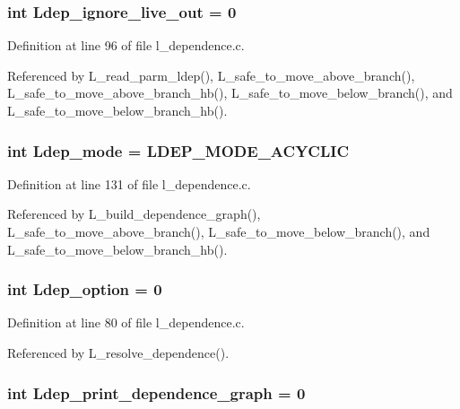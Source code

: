 \subsubsection{\setlength{\rightskip}{0pt plus 5cm}int \bf{Ldep\_\-ignore\_\-live\_\-out} = 0}\label{l__dependence_8c_6d934474a953e6ae08ebb56bf3e665fb}




Definition at line 96 of file l\_\-dependence.c.

Referenced by L\_\-read\_\-parm\_\-ldep(), L\_\-safe\_\-to\_\-move\_\-above\_\-branch(), L\_\-safe\_\-to\_\-move\_\-above\_\-branch\_\-hb(), L\_\-safe\_\-to\_\-move\_\-below\_\-branch(), and L\_\-safe\_\-to\_\-move\_\-below\_\-branch\_\-hb().
\subsubsection{\setlength{\rightskip}{0pt plus 5cm}int \bf{Ldep\_\-mode} = LDEP\_\-MODE\_\-ACYCLIC\hspace{0.3cm}{\tt  [static]}}\label{l__dependence_8c_681b9a75fbb67d7e5cd569408eb3f3da}




Definition at line 131 of file l\_\-dependence.c.

Referenced by L\_\-build\_\-dependence\_\-graph(), L\_\-safe\_\-to\_\-move\_\-above\_\-branch(), L\_\-safe\_\-to\_\-move\_\-below\_\-branch(), and L\_\-safe\_\-to\_\-move\_\-below\_\-branch\_\-hb().
\subsubsection{\setlength{\rightskip}{0pt plus 5cm}int \bf{Ldep\_\-option} = 0}\label{l__dependence_8c_1486b324e7da3513f46008bf5df24297}




Definition at line 80 of file l\_\-dependence.c.

Referenced by L\_\-resolve\_\-dependence().
\subsubsection{\setlength{\rightskip}{0pt plus 5cm}int \bf{Ldep\_\-print\_\-dependence\_\-graph} = 0}\label{l__dependence_8c_f37eabaa89a7a4aeed7b73da96e6d2f5}




